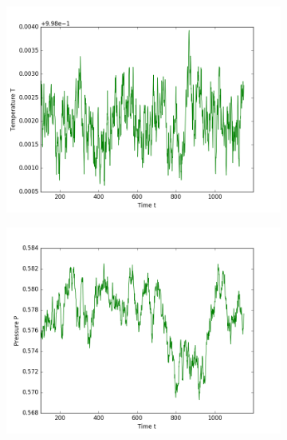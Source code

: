 \begin{figure}[ht]
\begin{subfigure}{0.3\textwidth}
\includegraphics[width=\textwidth]{fig/avTemperature_T1d0_F20d0_M100.png}
\end{subfigure}
\hfill
\begin{subfigure}{0.3\textwidth}
\includegraphics[width=\textwidth]{fig/avPressure_T1d0_F20d0_M100.png}
\end{subfigure}
\hfill
\begin{subfigure}{0.3\textwidth}

\end{subfigure}
\end{figure}
